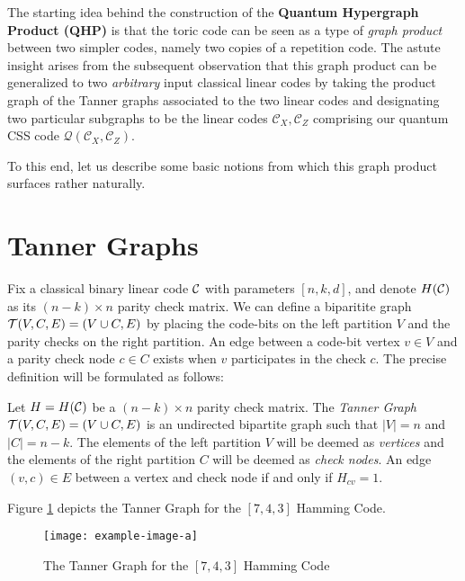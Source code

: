 \documentclass[twoside]{article}
\begin{document}
The starting idea behind the construction of the \textbf{Quantum Hypergraph Product (QHP)} is that the toric code can be seen as a type of \emph{graph product} between two simpler codes, namely two copies of a repetition code.
%
The astute insight arises from the subsequent observation that this graph product can be generalized to two \emph{arbitrary} input classical linear codes by taking the product graph of the Tanner graphs associated to the two linear codes and designating two particular subgraphs to be the linear codes $\mathcal{C}_X, \mathcal{C}_Z$ comprising our quantum CSS code $\mathcal{Q}(\mathcal{C}_X, \mathcal{C}_Z)$.

To this end, let us describe some basic notions from which this graph product surfaces rather naturally.

\section{Tanner Graphs}

Fix a classical binary linear code $\mathcal{C}$ with parameters $[n,k,d]$, and  denote $H(\mathcal{C})$ as its $(n-k) \times n$ parity check matrix. We can define a biparitite graph $\mathcal{T}(V,C,E) = (V \cup C, E)$ by placing the code-bits on the left partition $V$ and the parity checks on the right partition. An edge between a code-bit vertex $v \in V$ and a parity check node $c \in C$ exists when $v$ participates in the check $c$. The precise definition will be formulated as follows:

\begin{definition}
  Let $H = H(\mathcal{C})$ be a $(n-k) \times n$ parity check matrix. The \emph{Tanner Graph} $\mathcal{T}(V,C,E) = (V \cup C, E)$ is an undirected bipartite graph such that $|V| = n$ and $|C| = n-k$. The elements of the left partition $V$ will be deemed as \emph{vertices} and the elements of the right partition $C$ will be deemed as \emph{check nodes}. An edge $(v,c) \in E$ between a vertex and check node if and only if $H_{cv} = 1$.
\end{definition}

Figure \ref{fig:TanGraphHamming} depicts the Tanner Graph for the $[7,4,3]$ Hamming Code.


\begin{figure}[t!]
  \centering
  \texttt{[image: example-image-a]}
  \caption{The Tanner Graph for the $[7,4,3]$ Hamming Code}
  \label{fig:TanGraphHamming}
\end{figure}


 
\end{document}
